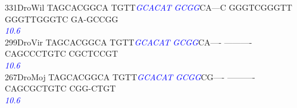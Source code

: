 \documentclass[11pt,twoside,reqno,a4paper]{article}
\begin{document}
{331\hspace*{1\charwidth}DroWil	TAGCACGGCA	TGTT\textit{\textcolor{Blue}{G}}\textit{\textcolor{Blue}{C}}\textit{\textcolor{Blue}{A}}\textit{\textcolor{Blue}{C}}\textit{\textcolor{Blue}{A}}\textit{\textcolor{Blue}{T}}	\textit{\textcolor{Blue}{G}}\textit{\textcolor{Blue}{C}}\textit{\textcolor{Blue}{G}}\textit{\textcolor{Blue}{G}}CA---C	GGGTCGGGTT	GGGTTGGGTC	GA-GCCGG\\
\hspace*{4\charwidth}\hspace*{7\charwidth}\hspace*{1\charwidth}\hspace*{14\charwidth}\textit{\textcolor{Blue}{10.6}}\hspace*{1\charwidth}\hspace*{1\charwidth}\hspace*{1\charwidth}\hspace*{1\charwidth}\\
299\hspace*{1\charwidth}DroVir	TAGCACGGCA	TGTT\textit{\textcolor{Blue}{G}}\textit{\textcolor{Blue}{C}}\textit{\textcolor{Blue}{A}}\textit{\textcolor{Blue}{C}}\textit{\textcolor{Blue}{A}}\textit{\textcolor{Blue}{T}}	\textit{\textcolor{Blue}{G}}\textit{\textcolor{Blue}{C}}\textit{\textcolor{Blue}{G}}\textit{\textcolor{Blue}{G}}CA----	----------	CAGCCCTGTC	CGCTCCGT\\
\hspace*{4\charwidth}\hspace*{7\charwidth}\hspace*{1\charwidth}\hspace*{14\charwidth}\textit{\textcolor{Blue}{10.6}}\hspace*{1\charwidth}\hspace*{1\charwidth}\hspace*{1\charwidth}\hspace*{1\charwidth}\\
267\hspace*{1\charwidth}DroMoj	TAGCACGGCA	TGTT\textit{\textcolor{Blue}{G}}\textit{\textcolor{Blue}{C}}\textit{\textcolor{Blue}{A}}\textit{\textcolor{Blue}{C}}\textit{\textcolor{Blue}{A}}\textit{\textcolor{Blue}{T}}	\textit{\textcolor{Blue}{G}}\textit{\textcolor{Blue}{C}}\textit{\textcolor{Blue}{G}}\textit{\textcolor{Blue}{G}}CG----	----------	CAGCGCTGTC	CGG-CTGT\\
\hspace*{4\charwidth}\hspace*{7\charwidth}\hspace*{1\charwidth}\hspace*{14\charwidth}\textit{\textcolor{Blue}{10.6}}\hspace*{1\charwidth}\hspace*{1\charwidth}\hspace*{1\charwidth}\hspace*{1\charwidth}\\
}
\end{document}
